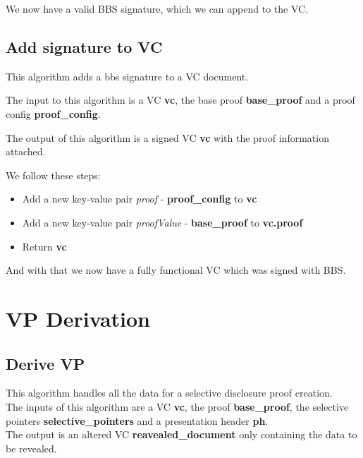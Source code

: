 \documentclass[
	a4paper               %
	,bibliography=totoc   %
	,listof=totoc         %
	,monolingual
]{bfhthesis}              %
\begin{document}
We now have a valid BBS signature, which we can append to the VC.

\section{Add signature to VC}
\label{subsubsec:signed}
This algorithm adds a bbs signature to a VC document.

The input to this algorithm is a VC \textbf{vc}, the base proof \textbf{base\_proof} and a proof config \textbf{proof\_config}.

The output of this algorithm is a signed VC \textbf{vc} with the proof information attached.

We follow these steps:
\begin{itemize}
	\item Add a new key-value pair \textit{proof} - \textbf{proof\_config} to \textbf{vc}
	\item Add a new key-value pair \textit{proofValue} - \textbf{base\_proof} to \textbf{vc.proof}
	\item Return \textbf{vc}
\end{itemize}

And with that we now have a fully functional VC which was signed with BBS.


\chapter{VP Derivation}

\section{Derive VP}
\label{subsub:derivevp}

This algorithm handles all the data for a selective disclosure proof creation.\\

The inputs of this algorithm are a VC \textbf{vc}, the proof \textbf{base\_proof}, the selective pointers \textbf{selective\_pointers} and a presentation header \textbf{ph}.\\

The output is an altered VC \textbf{reavealed\_document} only containing the data to be revealed.\\
\end{document}
